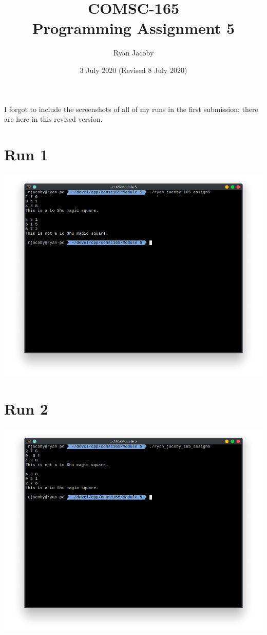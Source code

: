 \documentclass[letterpaper, 11pt]{article}
\title{COMSC-165 \\ Programming Assignment 5}
\author{Ryan Jacoby}
\date{3 July 2020 (Revised 8 July 2020)}
\begin{document}
\maketitle

I forgot to include the screenshots of all of my runs in the first submission; there are here in this revised version.

\section*{Run 1}
\includegraphics[scale=0.5]{run1.png} \\

\section*{Run 2}
\includegraphics[scale=0.5]{run2.png} \\
\end{document}
